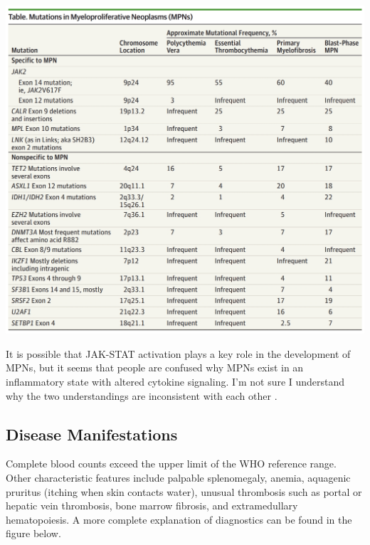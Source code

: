 \documentclass[]{book}
\newenvironment{Shaded}{\begin{snugshade}}{\end{snugshade}}
\newcommand{\DataTypeTok}[1]{\textcolor[rgb]{0.13,0.29,0.53}{#1}}
\newcommand{\DecValTok}[1]{\textcolor[rgb]{0.00,0.00,0.81}{#1}}
\newcommand{\KeywordTok}[1]{\textcolor[rgb]{0.13,0.29,0.53}{\textbf{#1}}}
\newcommand{\NormalTok}[1]{#1}
\newcommand{\OperatorTok}[1]{\textcolor[rgb]{0.81,0.36,0.00}{\textbf{#1}}}
\newcommand{\OtherTok}[1]{\textcolor[rgb]{0.56,0.35,0.01}{#1}}
\begin{document}
\includegraphics{images/06-5.jpg}

\begin{Shaded}
\end{Shaded}

\citep{tefferi2015myeloproliferative}

It is possible that JAK-STAT activation plays a key role in the development of MPNs, but it seems that people are confused why MPNs exist in an inflammatory state with altered cytokine signaling. I'm not sure I understand why the two understandings are inconsistent with each other \citep{rampal2014integrated}.

\hypertarget{disease-manifestations}{%
\subsection{Disease Manifestations}\label{disease-manifestations}}

Complete blood counts exceed the upper limit of the WHO reference range. Other characteristic features include palpable splenomegaly, anemia, aquagenic pruritus (itching when skin contacts water), unusual thrombosis such as portal or hepatic vein thrombosis, bone marrow fibrosis, and extramedullary hematopoiesis. A more complete explanation of diagnostics can be found in the figure below.
\end{document}
